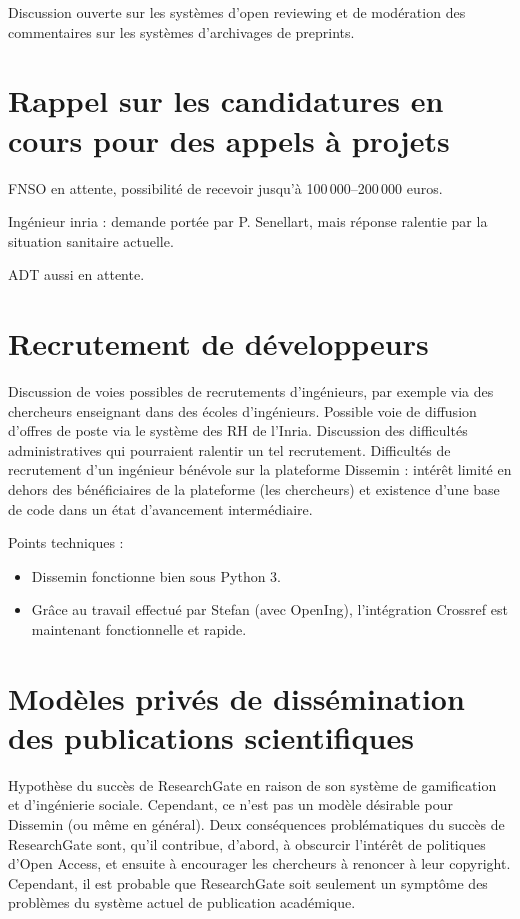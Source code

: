 \documentclass[a4paper]{article}
\begin{document}
Discussion ouverte sur les systèmes d'open reviewing et de modération des commentaires sur les systèmes d'archivages de preprints. 

\section{Rappel sur les candidatures en cours pour des appels à projets}
FNSO en attente, possibilité de recevoir jusqu'à 100\,000--200\,000 euros. 

Ingénieur inria : demande portée par P. Senellart, mais réponse ralentie par la situation sanitaire actuelle.

ADT aussi en attente. 

\section{Recrutement de développeurs}
Discussion de voies possibles de recrutements d'ingénieurs, par exemple via des chercheurs enseignant dans des écoles d'ingénieurs. Possible voie de diffusion d'offres de poste via le système des RH de l'Inria. Discussion des difficultés administratives qui pourraient ralentir un tel recrutement. Difficultés de recrutement d'un ingénieur bénévole sur la plateforme Dissemin : intérêt limité en dehors des bénéficiaires de la plateforme (les chercheurs) et existence d'une base de code dans un état d'avancement intermédiaire.


Points techniques : \begin{itemize}
\item Dissemin fonctionne bien sous Python 3. 
\item Grâce au travail effectué par Stefan (avec OpenIng), l'intégration Crossref est maintenant fonctionnelle et rapide. 
\end{itemize}

\section{Modèles privés de dissémination des publications scientifiques}

Hypothèse du succès de ResearchGate en raison de son système de gamification et d'ingénierie sociale. Cependant, ce n'est pas un modèle désirable pour Dissemin (ou même en général). Deux conséquences problématiques du succès de ResearchGate sont, qu'il contribue, d'abord, à obscurcir l'intérêt de politiques d'Open Access, et ensuite à encourager les chercheurs à renoncer à leur copyright. Cependant, il est probable que ResearchGate soit seulement un symptôme des problèmes du système actuel de publication académique.
\end{document}
